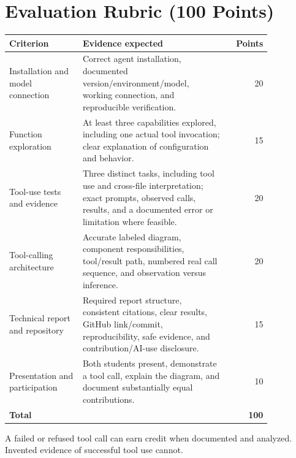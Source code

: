 \documentclass[11pt]{article}
\begin{document}
\section{Evaluation Rubric (100 Points)}
\renewcommand{\arraystretch}{1.15}
\begin{longtable}{p{0.29\linewidth}p{0.56\linewidth}r}
  \toprule
  Criterion                         & Evidence expected                                                                                                                                           & Points       \\
  \midrule
  \endhead
  Installation and model connection & Correct agent installation, documented version/environment/model, working connection, and reproducible verification.                                        & 20           \\
  Function exploration              & At least three capabilities explored, including one actual tool invocation; clear explanation of configuration and behavior.                                 & 15           \\
  Tool-use tests and evidence       & Three distinct tasks, including tool use and cross-file interpretation; exact prompts, observed calls, results, and a documented error or limitation where feasible. & 20           \\
  Tool-calling architecture         & Accurate labeled diagram, component responsibilities, tool/result path, numbered real call sequence, and observation versus inference.                      & 20           \\
  Technical report and repository   & Required report structure, consistent citations, clear results, GitHub link/commit, reproducibility, safe evidence, and contribution/AI-use disclosure.      & 15           \\
  Presentation and participation    & Both students present, demonstrate a tool call, explain the diagram, and document substantially equal contributions.                                        & 10           \\
  \midrule
  \textbf{Total}                    &                                                                                                                                                             & \textbf{100} \\
  \bottomrule
\end{longtable}

A failed or refused tool call can earn credit when documented and analyzed. Invented evidence of successful tool use cannot.
\end{document}
